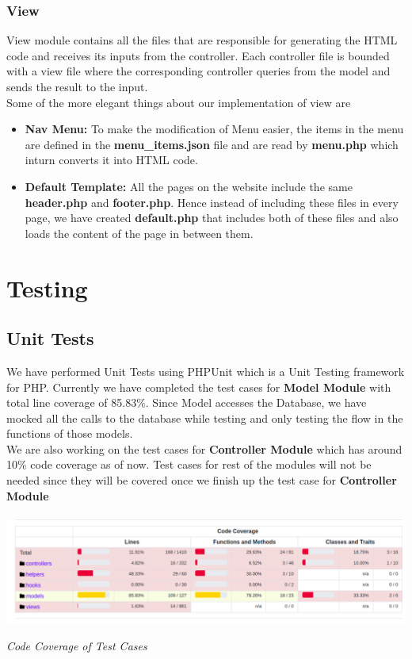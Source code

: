 \documentclass{mnnit}
\begin{document}
\subsection{View}
View module contains all the files that are responsible for generating the HTML code and receives its inputs from the controller. Each controller file is bounded with a view file where the corresponding controller queries from the model and sends the result to the input.\\
Some of the more elegant things about our implementation of view are
\begin{itemize}
    \item \textbf{Nav Menu:} To make the modification of Menu easier, the items in the menu are defined in the \textbf{menu\_items.json} file and are read by \textbf{menu.php} which inturn converts it into HTML code.
    \item \textbf{Default Template:} All the pages on the website include the same \textbf{header.php} and \textbf{footer.php}. Hence instead of including these files in every page, we have created \textbf{default.php} that includes both of these files and also loads the content of the page in between them.
\end{itemize}

\chapter{Testing}
\section{Unit Tests}
We have performed Unit Tests using PHPUnit which is a Unit Testing framework for PHP. Currently we have completed the test cases for \textbf{Model Module} with total line coverage of 85.83\%. Since Model accesses the Database, we have mocked all the calls to the database while testing and only testing the flow in the functions of those models.\\
We are also working on the test cases for \textbf{Controller Module} which has around 10\% code coverage as of now. Test cases for rest of the modules will not be needed since they will be covered once we finish up the test case for \textbf{Controller Module}\\\\
\includegraphics[width=\textwidth]{images/coverage.png}
\begin{center}
\emph{Code Coverage of Test Cases}
\end{center}
\end{document}
